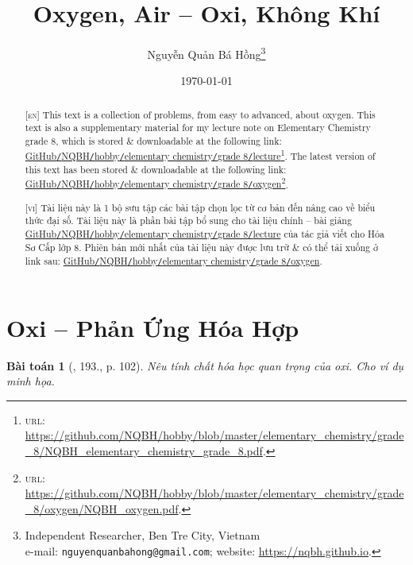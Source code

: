 \documentclass{article}
\title{Oxygen, Air -- Oxi, Không Khí}
\author{Nguyễn Quản Bá Hồng\footnote{Independent Researcher, Ben Tre City, Vietnam\\e-mail: \texttt{nguyenquanbahong@gmail.com}; website: \url{https://nqbh.github.io}.}}
\date{\today}
\newtheorem{baitoan}{Bài toán}
\begin{document}
\maketitle
\begin{abstract}
	\textsc{[en]} This text is a collection of problems, from easy to advanced, about oxygen. This text is also a supplementary material for my lecture note on Elementary Chemistry grade 8, which is stored \& downloadable at the following link: \href{https://github.com/NQBH/hobby/blob/master/elementary_chemistry/grade_8/NQBH_elementary_chemistry_grade_8.pdf}{GitHub\texttt{/}NQBH\texttt{/}hobby\texttt{/}elementary chemistry\texttt{/}grade 8\texttt{/}lecture}\footnote{\textsc{url}: \url{https://github.com/NQBH/hobby/blob/master/elementary_chemistry/grade_8/NQBH_elementary_chemistry_grade_8.pdf}.}. The latest version of this text has been stored \& downloadable at the following link: \href{https://github.com/NQBH/hobby/blob/master/elementary_chemistry/grade_8/oxygen/NQBH_oxygen.pdf}{GitHub\texttt{/}NQBH\texttt{/}hobby\texttt{/}elementary chemistry\texttt{/}grade 8\texttt{/}oxygen}\footnote{\textsc{url}: \url{https://github.com/NQBH/hobby/blob/master/elementary_chemistry/grade_8/oxygen/NQBH_oxygen.pdf}.}.
	\vspace{2mm}
	
	\textsc{[vi]} Tài liệu này là 1 bộ sưu tập các bài tập chọn lọc từ cơ bản đến nâng cao về biểu thức đại số. Tài liệu này là phần bài tập bổ sung cho tài liệu chính -- bài giảng \href{https://github.com/NQBH/hobby/blob/master/elementary_chemistry/grade_8/NQBH_elementary_chemistry_grade_8.pdf}{GitHub\texttt{/}NQBH\texttt{/}hobby\texttt{/}elementary chemistry\texttt{/}grade 8\texttt{/}lecture} của tác giả viết cho Hóa Sơ Cấp lớp 8. Phiên bản mới nhất của tài liệu này được lưu trữ \& có thể tải xuống ở link sau: \href{https://github.com/NQBH/hobby/blob/master/elementary_chemistry/grade_8/oxygen/NQBH_oxygen.pdf}{GitHub\texttt{/}NQBH\texttt{/}hobby\texttt{/}elementary chemistry\texttt{/}grade 8\texttt{/}oxygen}.
\end{abstract}
\tableofcontents
\newpage


\section{Oxi -- Phản Ứng Hóa Hợp}

\begin{baitoan}[\cite{An_400_BT_Hoa_Hoc_8_2020}, 193., p. 102]
	Nêu tính chất hóa học quan trọng của oxi. Cho ví dụ minh họa.
\end{baitoan}
\end{document}
